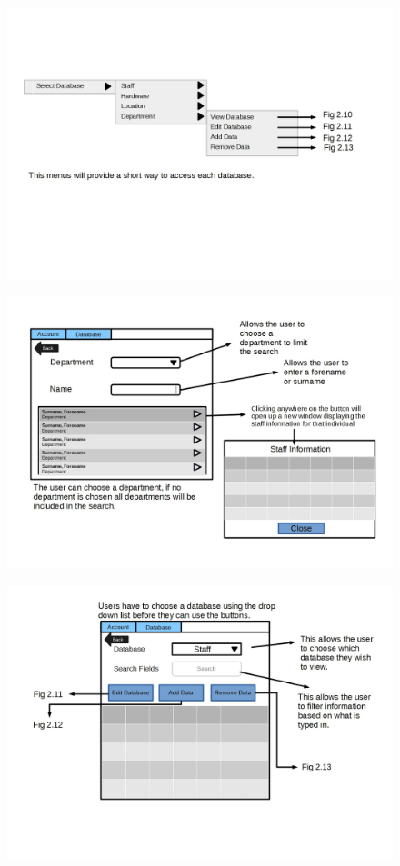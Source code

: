 \begin{figure}[H]
\includegraphics[width=\textwidth]{GUI_Design8.jpg}
\caption{}
\end{figure}

\begin{figure}[H]
\includegraphics[width=\textwidth]{GUI_Design9.jpg}
\caption{}
\end{figure}

\begin{figure}[H]
\includegraphics[width=\textwidth]{GUI_Design10.jpg}
\caption{}
\end{figure}

